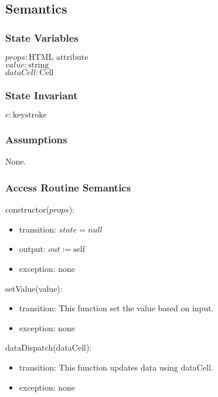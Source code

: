 \documentclass[12pt, titlepage]{article}
\begin{document}
\subsection{Semantics}

\subsubsection{State Variables}

$\mathit{props}: \text{HTML attribute}$\\
$\mathit{value}: \text{string}$\\
$\mathit{dataCell}: \text{Cell}$

\subsubsection{State Invariant}

$\mathit{e}: \text{keystroke}$

\subsubsection{Assumptions}

None.

\subsubsection{Access Routine Semantics}

\noindent constructor($props$):
\begin{itemize}
\item transition: $\mathit{state} = null $
\item output: $out := \mbox{self}$
\item exception: none
\end{itemize}

\noindent setValue(value):
\begin{itemize}
\item transition: This function set the value based on input.
\item exception: none
\end{itemize}

\noindent dataDispatch(dataCell):
\begin{itemize}
\item transition: This function updates data using dataCell.
\item exception: none
\end{itemize}
\end{document}
